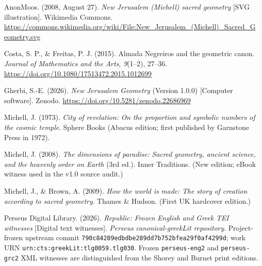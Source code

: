\begin{thebibliography}{}
\setlength{\bibsep}{0.4em}

AnonMoos. (2008, August 27). \emph{New Jerusalem (Michell) sacred geometry} [SVG illustration]. Wikimedia Commons.\newline
\url{https://commons.wikimedia.org/wiki/File:New_Jerusalem_(Michell)_Sacred_Geometry.svg}

Costa, S. P., \& Freitas, P. J. (2015). Almada Negreiros and the geometric canon.
\emph{Journal of Mathematics and the Arts, 9}(1--2), 27--36.
\url{https://doi.org/10.1080/17513472.2015.1012699}

Gherbi, S.-E. (2026). \emph{New Jerusalem Geometry} (Version 1.0.0) [Computer software]. Zenodo.
\url{https://doi.org/10.5281/zenodo.22686969}

Michell, J. (1973). \emph{City of revelation: On the proportion and symbolic numbers of the cosmic temple}.
Sphere Books (Abacus edition; first published by Garnstone Press in 1972).

Michell, J. (2008). \emph{The dimensions of paradise: Sacred geometry, ancient science, and the heavenly order on Earth}
(3rd ed.). Inner Traditions. (New edition; eBook witness used in the v1.0 source audit.)

Michell, J., \& Brown, A. (2009). \emph{How the world is made: The story of creation according to sacred geometry}.
Thames \& Hudson. (First UK hardcover edition.)

Perseus Digital Library. (2026). \emph{Republic: Frozen English and Greek TEI witnesses} [Digital text witnesses].
\emph{Perseus canonical-greekLit repository}.
Project-frozen upstream commit \texttt{790c84289edbdbe289dd7b752bfea29f0af4299d}; work URN
\texttt{urn:cts:greekLit:tlg0059.tlg030}. Frozen \texttt{perseus-eng2} and
\texttt{perseus-grc2} XML witnesses are distinguished from the Shorey and Burnet print editions.


\end{thebibliography}
